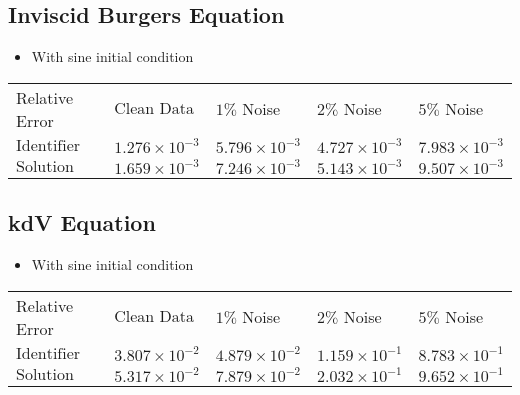 \documentclass[12pt]{article}
\begin{document}
\newpage

\subsection{Inviscid Burgers Equation}

\begin{itemize}
    \item With sine initial condition 
\end{itemize}
	\tabulinesep=4mm
	{ \large  }
	\vspace{3mm}
	\begin{tabu} to \linewidth { | X[c] | X[c] | X[c] | X[c] | X[c] | }
		 \hline
		\everyrow{\hline}
		Relative Error	& $\text{Clean Data}$ & $1 \%$ Noise & $2 \%$ Noise & $5 \%$ Noise \\
		$\text{Identifier}$ & $1.276 \times 10^{-3}$  & $5.796 \times 10^{-3}$   & $4.727 \times 10^{-3}$  & $7.983 \times 10^{-3}$ \\
		$\text{Solution}$ & $1.659 \times 10^{-3}$ &  $7.246 \times 10^{-3}$ & $5.143 \times 10^{-3}$    &  $9.507 \times 10^{-3}$  \\
	\end{tabu}

\subsection{kdV Equation}


\begin{itemize}
    \item With sine initial condition 
\end{itemize}
	\tabulinesep=4mm
	{ \large  }
	\vspace{3mm}
	\begin{tabu} to \linewidth { | X[c] | X[c] | X[c] | X[c] | X[c] | }
		 \hline
		\everyrow{\hline}
		Relative Error	& $\text{Clean Data}$ & $1 \%$ Noise & $2 \%$ Noise & $5 \%$ Noise \\
		$\text{Identifier}$ & $3.807 \times 10^{-2}$  & $4.879 \times 10^{-2}$   & $1.159 \times 10^{-1}$  & $8.783 \times 10^{-1}$ \\
		$\text{Solution}$ & $5.317 \times 10^{-2}$ &  $7.879 \times 10^{-2}$ & $2.032 \times 10^{-1}$    &  $9.652 \times 10^{-1}$  \\
	\end{tabu}
	
\end{document}
